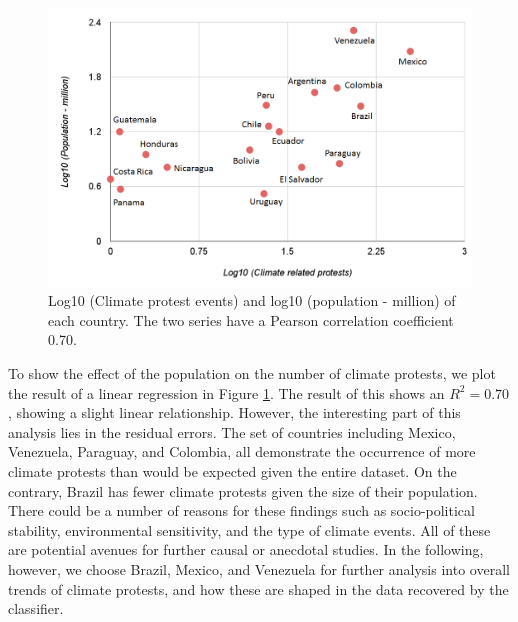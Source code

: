 \documentclass[9pt,twocolumn,twoside]{pnas-new}
\begin{document}



\begin{figure}[ht]
\centerline
{\includegraphics[width=.45\textwidth]{figures/protest-population}}
\caption{Log10 (Climate protest events) and log10 (population - million) of each country. The two series have a Pearson correlation coefficient 0.70.}
\label{protest-population}
\end{figure}

To show the effect of the population on the number of climate protests, we plot the result of a linear regression in Figure \ref{protest-population}.
The result of this shows an $R^2 = 0.70$, showing a slight linear relationship.
However, the interesting part of this analysis lies in the residual errors.
The set of countries including Mexico, Venezuela, Paraguay, and Colombia, all demonstrate the occurrence of more climate protests than would be expected given the entire dataset.
On the contrary, Brazil has fewer climate protests given the size of their population.
There could be a number of reasons for these findings such as socio-political stability, environmental sensitivity, and the type of climate events.
All of these are potential avenues for further causal or anecdotal studies.
In the following, however, we choose Brazil, Mexico, and Venezuela for further analysis into overall trends of climate protests, and how these are shaped in the data recovered by the classifier.
\end{document}
